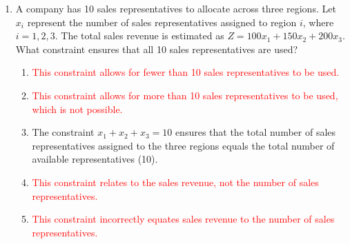 \documentclass{article}%
\newcommand{\incorrect}[1]{\textcolor{red}{#1}}
\begin{document}
\begin{enumerate}
\begin{enumerate}%
\item This is a resource allocation problem, specifically a type of transportation problem where salespeople are the resources being transported to different territories (destinations).  The objective is to maximize total sales revenue.%
\item \incorrect{An assignment problem involves assigning tasks to individuals, with each task assigned to exactly one individual. This problem involves allocating multiple salespeople to each territory.}%
\item \incorrect{A diet problem focuses on minimizing cost while meeting nutritional requirements. This problem aims to maximize sales revenue.}%
\item \incorrect{A production planning problem deals with optimizing production quantities given resource constraints. This problem focuses on allocating salespeople.}%
\item \incorrect{Network flow problems involve optimizing the flow of goods or resources through a network. While there's a flow of salespeople, the problem doesn't explicitly model a network structure.}%
\end{enumerate}%
\vspace{1em}%
\item A company has 10 sales representatives to allocate across three regions.  Let $x_i$ represent the number of sales representatives assigned to region $i$, where $i = 1, 2, 3$.  The total sales revenue is estimated as $Z = 100x_1 + 150x_2 + 200x_3$. What constraint ensures that all 10 sales representatives are used?%
\begin{enumerate}%
\item \incorrect{This constraint allows for fewer than 10 sales representatives to be used.}%
\item \incorrect{This constraint allows for more than 10 sales representatives to be used, which is not possible.}%
\item The constraint $x_1 + x_2 + x_3 = 10$ ensures that the total number of sales representatives assigned to the three regions equals the total number of available representatives (10).%
\item \incorrect{This constraint relates to the sales revenue, not the number of sales representatives.}%
\item \incorrect{This constraint incorrectly equates sales revenue to the number of sales representatives.}%
\end{enumerate}%

\end{enumerate}
\end{document}
